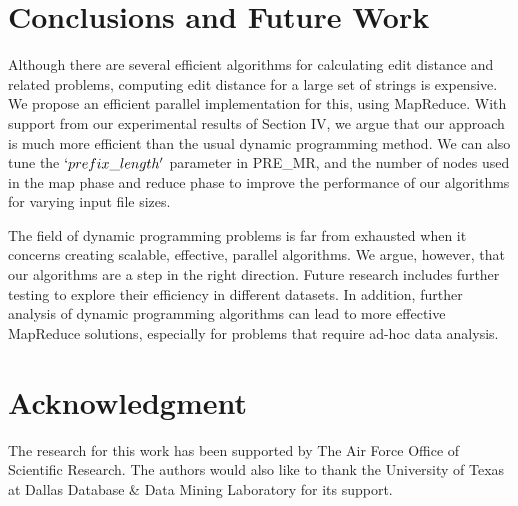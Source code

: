 \documentclass[conference]{IEEEtran}
\begin{document}
\section{Conclusions and Future Work}
Although there are several efficient algorithms for calculating edit distance and related problems, computing edit distance for a large set of strings is expensive. We propose an efficient parallel implementation for this, using MapReduce. With support from our experimental results of Section IV, we argue that our approach is much more efficient than the usual dynamic programming method. We can also tune the $`prefix\_length'$ parameter in PRE\_MR, and the number of nodes used in the map phase and reduce phase to improve the performance of our algorithms for varying input file sizes. 

The field of dynamic programming problems is far from exhausted when it concerns creating scalable, effective, parallel algorithms. We argue, however, that our algorithms are a step in the right direction. Future research includes further testing to explore their efficiency in different datasets. In addition, further analysis of dynamic programming algorithms can lead to more effective MapReduce solutions, especially for problems that require ad-hoc data analysis.


\section*{Acknowledgment}

The research for this work has been supported by The Air Force Office of Scientific Research. The authors would also like to thank the University of Texas at Dallas Database \& Data Mining Laboratory for its support. 
\end{document}
